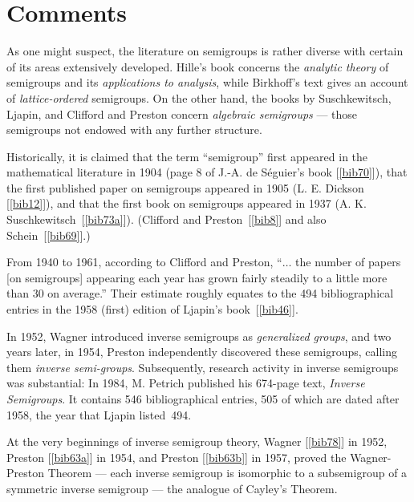 \documentclass{surv-l}
\numberwithin{equation}{section}
\numberwithin{table}{section}
\numberwithin{figure}{section}
\theoremstyle{plain}
\theoremstyle{definition}
\begin{document}
\section{Comments}\label{sec1.4}

As one might suspect, the literature on semigroups is rather
diverse with certain of its areas extensively developed.
Hille's book concerns the \emph{analytic
theory} of semigroups and its
\emph{applications to analysis}, while Birkhoff's
text gives an account of
\emph{lattice-ordered} semigroups. On the
other hand, the books by Suschkewitsch,
Ljapin, and Clifford and
Preston concern \emph{algebraic semigroups} --- those semigroups not endowed with any further
structure.

Historically, it is claimed that the term ``semigroup'' first
appeared in the mathematical literature in 1904 (page 8 of J.-A.
de S\'{e}guier's book
[\ref{bib70}]), that the first published paper
on semigroups appeared in 1905 (L. E. Dickson
[\ref{bib12}]), and that the first book on
semigroups appeared in 1937 (A. K.
Suschkewitsch~[\ref{bib73a}]). (Clifford and
Preston~[\ref{bib8}] and
also Schein~[\ref{bib69}].)

From 1940 to 1961, according to Clifford and Preston, ``$\ldots$
the number of papers [on semigroups] appearing each year has grown
fairly steadily to a little more than 30 on average.'' Their
estimate roughly equates to the 494 bibliographical entries in the
1958 (first) edition of Ljapin's
book~[\ref{bib46}].

In 1952, Wagner introduced inverse semigroups as \emph{generalized
groups}, and two years later, in 1954, Preston independently
discovered these semigroups, calling them
\emph{inverse semi-groups}.
Subsequently, research activity in inverse semigroups was
substantial: In 1984, M. Petrich published his 674-page text,
\emph{Inverse Semigroups}. It contains
546 bibliographical entries, 505 of which are dated after 1958,
the year that Ljapin listed~494.

At the very beginnings of inverse semigroup theory,
Wagner [\ref{bib78}] in
1952, Preston
[\ref{bib63a}] in 1954, and
Preston [\ref{bib63b}] in
1957, proved the Wagner-Preston Theorem --- each inverse semigroup
is isomorphic to a subsemigroup of a symmetric
inverse semigroup
--- the analogue of Cayley's Theorem.
\end{document}
